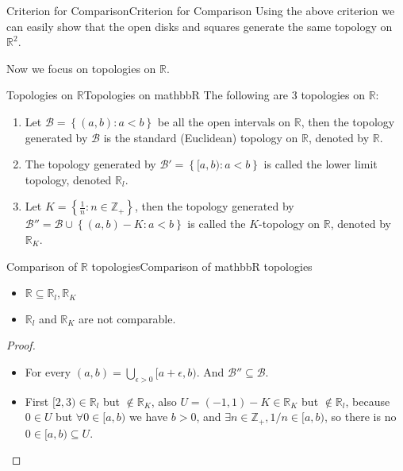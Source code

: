 \documentclass[../main.tex]{subfiles}
\begin{document}
\begin{example}{Criterion for Comparison}{Criterion for Comparison}
Using the above criterion we can easily show that the open disks and squares generate the same topology on $\mathbb{R}^2$.
\end{example}

Now we focus on topologies on $\mathbb{R}$.

\begin{definition}{Topologies on $\mathbb{R}$}{Topologies on mathbbR}
The following are 3 topologies on $\mathbb{R}$:
\begin{enumerate}
\item Let $\mathcal{B} = \left\{ (a,b): a<b \right\}$ be all the open intervals on $\mathbb{R}$, then the topology generated by $\mathcal{B}$ is the standard (Euclidean) topology on $\mathbb{R}$, denoted by $\mathbb{R}$.
\item The topology generated by $ \mathcal{B}' = \left\{ [a,b): a<b \right\}$ is called the lower limit topology, denoted $\mathbb{R}_{l}$.
\item Let $K = \left\{ \frac{1}{n}: n\in \mathbb{Z}_+ \right\}$, then the topology generated by $\mathcal{B}''= \mathcal{B} \cup \left\{ (a,b)-K: a<b \right\}$ is called the $K$-topology on $\mathbb{R}$, denoted by $\mathbb{R}_K$.
\end{enumerate}
\end{definition}

\begin{proposition}{Comparison of $\mathbb{R}$ topologies}{Comparison of mathbbR topologies}

\begin{itemize}
\item $\mathbb{R} \subseteq \mathbb{R}_l, \mathbb{R}_K$
\item $\mathbb{R}_l$ and $\mathbb{R}_K$ are not comparable.
\end{itemize}
\end{proposition}
\begin{proof}
\begin{itemize}
\item For every $(a,b) = \bigcup_{\epsilon>0} [a+\epsilon,b)$. And $\mathcal{B}'' \subseteq \mathcal{B}$.
\item First $[2,3)\in \mathbb{R}_l$ but $\notin \mathbb{R}_K$, also $U = (-1,1)-K\in \mathbb{R}_K$ but $\notin \mathbb{R}_l$, because $0\in U$ but $\forall 0\in [a,b)$ we have $b>0$, and $\exists n\in \mathbb{Z}_+, 1 / n \in [a,b)$, so there is no $0\in [a,b) \subseteq U$.
\end{itemize}
\end{proof}
\end{document}
